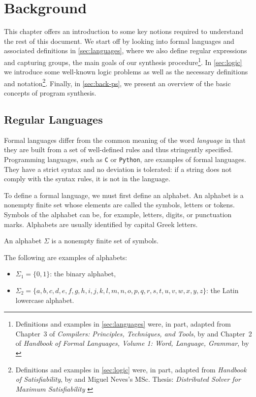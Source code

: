 \chapter{Background}\label{chap:background}
This chapter offers an introduction to some key notions required to understand the rest of this document.
%
We start off by looking into formal languages and associated definitions in \autoref{sec:languages}, where we also define regular expressions and capturing groups, the main goals of our synthesis procedure\footnote{Definitions and examples in \autoref{sec:languages} were, in part, adapted from Chapter~3 of \textit{Compilers: Principles, Techniques, and Tools}, by \citet*{DragonBook} and Chapter~2 of \textit{Handbook of Formal Languages, Volume 1: Word, Language, Grammar}, by \citet{HandbookFormalLanguages1}}.
%
In \autoref{sec:logic} we introduce some well-known logic problems as well as the necessary definitions and notation\footnote{Definitions and examples in \autoref{sec:logic}
were, in part, adapted from \textit{Handbook of Satisfiability}, by \citet*{HandbookSAT} and Miguel Neves's MSc. Thesis: \textit{Distributed Solver for Maximum Satisfiability} \cite{MiguelThesis}}.
%
Finally, in \autoref{sec:back-ps}, we present an overview of the basic concepts of program synthesis.

\section{Regular Languages}\label{sec:languages}
Formal languages differ from the common meaning of the word \textit{language} in that they are built from a set of well-defined rules and thus stringently specified. Programming languages, such as \texttt{C} or \texttt{Python}, are examples of formal languages. They have a strict syntax and no deviation is tolerated: if a string does not comply with the syntax rules, it is not in the language.

To define a formal language, we must first define an alphabet.
An alphabet is a nonempty finite set whose elements are called the symbols, letters or tokens.
Symbols of the alphabet can be, for example, letters, digits, or punctuation marks. Alphabets are usually identified by capital Greek letters.

\begin{definition}[Alphabet]
An alphabet \(\Sigma\) is a nonempty finite set of symbols.
\end{definition}

\begin{example}
The following are examples of alphabets:

\begin{itemize}
\item \(\Sigma_1 = \{0,1\}\): the binary alphabet,
\item \(\Sigma_2 = \{a,b,c,d,e,f,g,h,i,j,k,l,m,n,o,p,q,r,s,t,u,v,w,x,y,z\}\): the Latin lowercase alphabet.
\end{itemize}
\end{example}


